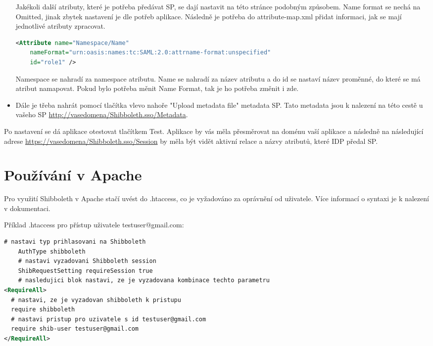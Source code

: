 \begin{itemize}
Jakékoli další atributy, které je potřeba předávat SP, se dají nastavit na této stránce podobným způsobem. Name format se nechá na Omitted, jinak zbytek nastavení je dle potřeb aplikace. Následně je potřeba do attribute-map.xml přidat informaci, jak se mají jednotlivé atributy zpracovat.
   \begin{lstlisting}[language=XML]
     <Attribute name="Namespace/Name"
    nameFormat="urn:oasis:names:tc:SAML:2.0:attrname-format:unspecified"
    id="role1" />
    \end{lstlisting}
Namespace se nahradí za namespace atributu. Name se nahradí za název atributu a do id se nastaví název proměnné, do které se má atribut namapovat. Pokud bylo potřeba měnit Name Format, tak je ho potřeba změnit i zde.\cite{AddAttribute}
    


    \item Dále je třeba nahrát pomocí tlačítka vlevo nahoře "Upload metadata file" metadata SP. Tato metadata jsou k nalezení na této cestě u vašeho SP \url{http://vasedomena/Shibboleth.sso/Metadata}.

\end{itemize}

Po nastavení se dá aplikace otestovat tlačítkem Test. Aplikace by vás měla přesměrovat na doménu vaší aplikace a následně na následující adrese \url{https://vasedomena/Shibboleth.sso/Session} by měla být vidět aktivní relace a názvy atributů, které IDP předal SP.

\section{Používání v Apache}

Pro využití Shibboleth v Apache stačí uvést do .htaccess, co je vyžadováno za oprávnění od uživatele. Více informací o syntaxi je k nalezení v dokumentaci\cite{SPApache}\cite{SPhtaccess}. \linebreak

Příklad .htaccess pro přístup uživatele testuser@gmail.com:

 \begin{lstlisting}[language=xml]
    # nastavi typ prihlasovani na Shibboleth
    AuthType shibboleth
    # nastavi vyzadovani Shibboleth session
    ShibRequestSetting requireSession true
    # nasledujici blok nastavi, ze je vyzadovana kombinace techto parametru
<RequireAll>
  # nastavi, ze je vyzadovan shibboleth k pristupu
  require shibboleth 
  # nastavi pristup pro uzivatele s id testuser@gmail.com
  require shib-user testuser@gmail.com 
</RequireAll>
    \end{lstlisting}


